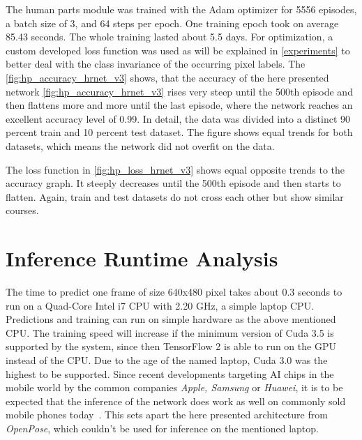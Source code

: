 The human parts module was trained with the Adam optimizer for 5556 episodes, a batch size of 3,
and 64 steps per epoch.
One training epoch took on average 85.43 seconds.
The whole training lasted about 5.5 days.
For optimization, a custom developed loss function was used as will be explained in
\autoref{experiments} to better deal with the class invariance of the occurring pixel labels.
The \autoref{fig:hp_accuracy_hrnet_v3} shows, that the accuracy of the here presented network
\autoref{fig:hp_accuracy_hrnet_v3} rises very steep until the 500th episode and then flattens more and more until the
last
episode, where the network reaches an excellent accuracy level of 0.99.
In detail, the data was divided into a distinct 90 percent train and 10 percent test dataset.
The figure shows equal trends for both datasets, which means the network did not overfit on the data.\

The loss function in \autoref{fig:hp_loss_hrnet_v3} shows equal opposite trends to the accuracy graph.
It steeply decreases until the 500th episode and then starts to flatten.
Again, train and test datasets do not cross each other but show similar courses.

\section{Inference Runtime Analysis}
The time to predict one frame of size 640x480 pixel takes about 0.3 seconds to run on a Quad-Core Intel i7 CPU with 2.20 GHz,
a simple laptop CPU.
Predictions and training can run on simple hardware as the above mentioned CPU.
The training speed will increase if the minimum version of Cuda
3.5 is supported by the system, since then TensorFlow 2 is able to run on the GPU instead of the CPU.
Due to the age of the named laptop, Cuda 3.0 was the highest to be supported.
Since recent developments targeting AI chips in the mobile world by the common companies \textit{Apple, Samsung} or \textit{Huawei},
it is to be expected that the inference of the network does work as well on commonly sold mobile phones today~\cite{mobileAI}.
This sets apart the here presented architecture from \textit{OpenPose}, which couldn't be used for inference on the mentioned laptop.

